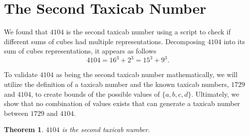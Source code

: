 \documentclass[12pt]{amsart}
\newtheorem{theorem}{Theorem}
\theoremstyle{definition}
\theoremstyle{remark}
\begin{document}
\section{The Second Taxicab Number}\label{sec:second}
We found that $4104$ is the second taxicab number using a script to check if different sums of cubes had multiple representations. Decomposing $4104$ into its sum of cubes representations, it appears as follows
\[
    4104 = 16^3+2^3=15^3+9^3.
\]

To validate $4104$ as being the second taxicab number mathematically, we will utilize the definition of a taxicab number and the known taxicab numbers, $1729$ and $4104$, to create bounds of the possible values of $\{a,b,c,d\}$. Ultimately, we show that no combination of values exists that can generate a taxicab number between $1729$ and $4104$.

\begin{theorem}
    $4104$ is the second taxicab number.
\end{theorem}
\end{document}
